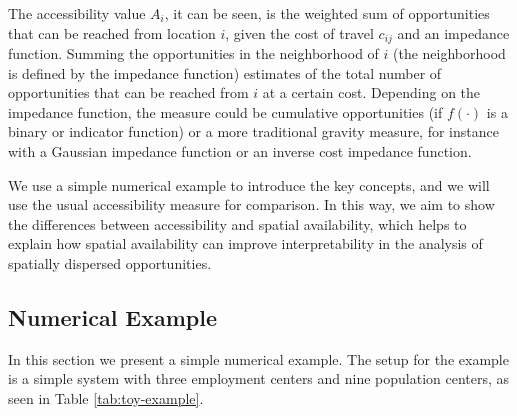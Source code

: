 \documentclass[]{elsarticle} %
\begin{document}
The accessibility value \(A_i\), it can be seen, is the weighted sum of
opportunities that can be reached from location \(i\), given the cost of
travel \(c_{ij}\) and an impedance function. Summing the opportunities
in the neighborhood of \(i\) (the neighborhood is defined by the
impedance function) estimates of the total number of opportunities that
can be reached from \(i\) at a certain cost. Depending on the impedance
function, the measure could be cumulative opportunities (if \(f(\cdot)\)
is a binary or indicator function) or a more traditional gravity
measure, for instance with a Gaussian impedance function or an inverse
cost impedance function.

We use a simple numerical example to introduce the key concepts, and we
will use the usual accessibility measure for comparison. In this way, we
aim to show the differences between accessibility and spatial
availability, which helps to explain how spatial availability can
improve interpretability in the analysis of spatially dispersed
opportunities.

\hypertarget{numerical-example}{%
\subsection{Numerical Example}\label{numerical-example}}

In this section we present a simple numerical example. The setup for the
example is a simple system with three employment centers and nine
population centers, as seen in Table \ref{tab:toy-example}.
\end{document}
